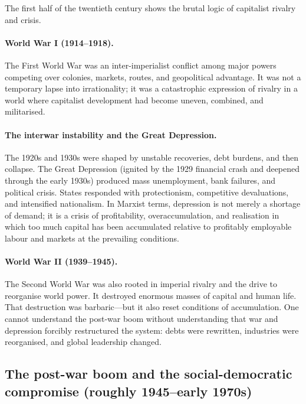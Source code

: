 The first half of the twentieth century shows the brutal logic of capitalist rivalry and crisis.

\paragraph{World War I (1914--1918).}
The First World War was an inter-imperialist conflict among major powers competing over colonies, markets,
routes, and geopolitical advantage. It was not a temporary lapse into irrationality; it was a catastrophic
expression of rivalry in a world where capitalist development had become uneven, combined, and militarised.

\paragraph{The interwar instability and the Great Depression.}
The 1920s and 1930s were shaped by unstable recoveries, debt burdens, and then collapse. The Great Depression
(ignited by the 1929 financial crash and deepened through the early 1930s) produced mass unemployment,
bank failures, and political crisis. States responded with protectionism, competitive devaluations,
and intensified nationalism. In Marxist terms, depression is not merely a shortage of demand; it is a crisis
of profitability, overaccumulation, and realisation in which too much capital has been accumulated relative to
profitably employable labour and markets at the prevailing conditions.

\paragraph{World War II (1939--1945).}
The Second World War was also rooted in imperial rivalry and the drive to reorganise world power. It destroyed
enormous masses of capital and human life. That destruction was barbaric—but it also reset conditions of
accumulation. One cannot understand the post-war boom without understanding that war and depression forcibly
restructured the system: debts were rewritten, industries were reorganised, and global leadership changed.

\subsection{The post-war boom and the social-democratic compromise (roughly 1945--early 1970s)}
\label{subsec:postwar-boom}

